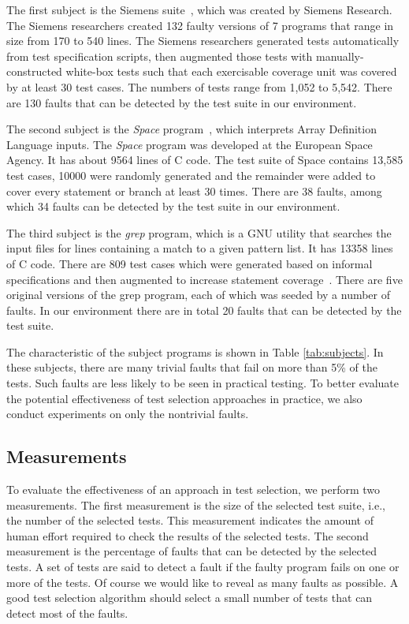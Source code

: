 \documentclass{sig-alternate}
\begin{document}
The first subject is the Siemens suite~\cite{Hutchins94}, which was
created by Siemens Research. The Siemens researchers created 132
faulty versions of 7 programs that range in size from 170 to 540
lines. The Siemens researchers generated tests automatically from
test specification scripts, then augmented those tests with
manually-constructed white-box tests such that each exercisable
coverage unit was covered by at least 30 test cases. The numbers of
tests range from 1,052 to 5,542. There are 130 faults that can be
detected by the test suite in our environment.

The second subject is the {\it Space} program~\cite{Rothermel01},
which interprets Array Definition Language inputs. The {\it Space}
program was developed at the European Space Agency. It has about
9564 lines of C code. The test suite of Space contains 13,585 test
cases, 10000 were randomly generated and the remainder were added to
cover every statement or branch at least 30 times. There are 38
faults, among which 34 faults can be detected by the test suite in
our environment.



The third subject is the {\it grep} program, which is a GNU utility
that searches the input files for lines containing a match to a
given pattern list. It has 13358 lines of C code. There are 809 test
cases which were generated based on informal specifications and then
augmented to increase statement coverage~\cite{SIR}. There are five
original versions of the grep program, each of which was seeded by a
number of faults. In our environment there are in total 20 faults
that can be detected by the test suite.


The characteristic of the subject programs is shown in Table
\ref{tab:subjects}. In these subjects, there are many trivial faults
that fail on more than 5\% of the tests. Such faults are less likely
to be seen in practical testing. To better evaluate the potential
effectiveness of test selection approaches in practice, we also
conduct experiments on only the nontrivial faults.




\subsection{Measurements}



To evaluate the effectiveness of an approach in test selection, we
perform two measurements. The first measurement is the size of the
selected test suite, i.e., the number of the selected tests. This
measurement indicates the amount of human effort required to check
the results of the selected tests. The second measurement is the
percentage of faults that can be detected by the selected tests. A
set of tests are said to detect a fault if the faulty program fails
on one or more of the tests. Of course we would like to reveal as
many faults as possible. A good test selection algorithm should
select a small number of tests that can detect most of the faults.
\end{document}
